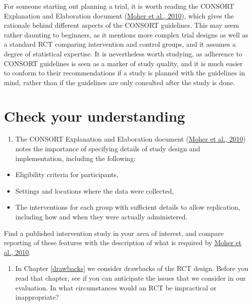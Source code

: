 \documentclass{krantz}
\providecommand{\tightlist}{%
\setlength{\itemsep}{0pt}\setlength{\parskip}{0pt}}
\begin{document}
For someone starting out planning a trial, it is worth reading the CONSORT Explanation and Elaboration document (\protect\hyperlink{ref-moher2010}{Moher et al., 2010}), which gives the rationale behind different aspects of the CONSORT guidelines. This may seem rather daunting to beginners, as it mentions more complex trial designs as well as a standard RCT comparing intervention and control groups, and it assumes a degree of statistical expertise. It is nevertheless worth studying, as adherence to CONSORT guidelines is seen as a marker of study quality, and it is much easier to conform to their recommendations if a study is planned with the guidelines in mind, rather than if the guidelines are only consulted after the study is done.

\hypertarget{check-your-understanding-9}{%
\section{Check your understanding}\label{check-your-understanding-9}}

\begin{enumerate}
\def\labelenumi{\arabic{enumi}.}
\tightlist
\item
  The CONSORT Explanation and Elaboration document (\protect\hyperlink{ref-moher2010}{Moher et al., 2010}) notes the importance of specifying details of study design and implementation, including the following:
\end{enumerate}

\begin{itemize}
\tightlist
\item
  Eligibility criteria for participants,  
\item
  Settings and locations where the data were collected,  
\item
  The interventions for each group with sufficient details to allow replication, including how and when they were actually administered.
\end{itemize}

Find a published intervention study in your area of interest, and compare reporting of these features with the description of what is required by \protect\hyperlink{ref-moher2010}{Moher et al., 2010}.

\begin{enumerate}
\def\labelenumi{\arabic{enumi}.}
\setcounter{enumi}{1}
\tightlist
\item
  In Chapter \ref{drawbacks} we consider drawbacks of the RCT design. Before you read that chapter, see if you can anticipate the issues that we consider in our evaluation. In what circumstances would an RCT be impractical or inappropriate?
\end{enumerate}
\end{document}
